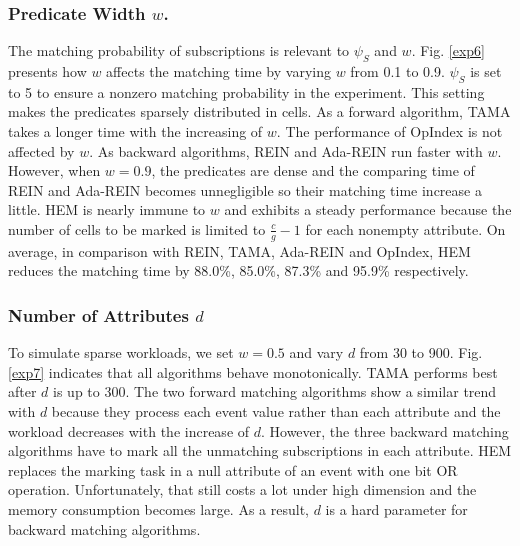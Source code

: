 \documentclass[runningheads]{llncs}
\begin{document}
\subsubsection{Predicate Width $w$.}
The matching probability of subscriptions is relevant to $\psi_S$ and $w$. Fig. \ref{exp6} presents how $w$ affects the matching time by varying $w$ from 0.1 to 0.9. $\psi_S$ is set to 5 to ensure a nonzero matching probability in the experiment. This setting makes the predicates sparsely distributed in cells. As a forward algorithm, TAMA takes a longer time with the increasing of $w$. The performance of OpIndex is not affected by $w$. As backward algorithms, REIN and Ada-REIN run faster with $w$. However, when $w=0.9$, the predicates are dense and the comparing time of REIN and Ada-REIN becomes unnegligible so their matching time increase a little. HEM is nearly immune to $w$ and exhibits a steady performance because the number of cells to be marked is limited to $\frac{c}{g}-1$ for each nonempty attribute. On average, in comparison with REIN, TAMA, Ada-REIN and OpIndex, HEM reduces the matching time by 88.0\%, 85.0\%, 87.3\% and 95.9\% respectively. 


\subsubsection{Number of Attributes $d$}
To simulate sparse workloads, we set $w=0.5$ and vary $d$ from 30 to 900. Fig. \ref{exp7} indicates that all algorithms behave monotonically. TAMA performs best after $d$ is up to 300. The two forward matching algorithms show a similar trend with $d$ because they process each event value rather than each attribute and the workload decreases with the increase of $d$. However, the three backward matching algorithms have to mark all the unmatching subscriptions in each attribute. HEM replaces the marking task in a null attribute of an event with one bit OR operation. Unfortunately, that still costs a lot under high dimension and the memory consumption becomes large. As a result, $d$ is a hard parameter for backward matching algorithms.
\end{document}
